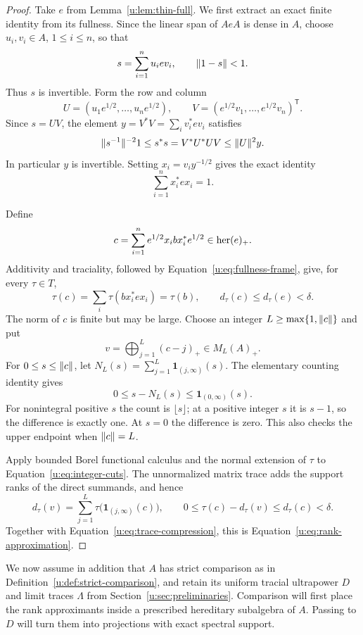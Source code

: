 \begin{proof}
Take $e$ from Lemma~\ref{u:lem:thin-full}.  We first extract an exact
finite identity from its fullness.  Since the linear span of $AeA$ is
dense in $A$, choose $u_i,v_i\in A$, $1\le i\le n$, so that
\[
 s=\sum_{i=1}^n u_i e v_i,\qquad \lVert1-s\rVert<1.
\]
Thus $s$ is invertible.  Form the row and column
\[
 U=(u_1e^{1/2},\ldots,u_ne^{1/2}),\qquad
 V=(e^{1/2}v_1,\ldots,e^{1/2}v_n)^{\mathsf T}.
\]
Since $s=UV$, the element $y=V^*V=\sum_i v_i^*ev_i$ satisfies
\[
 \lVert s^{-1}\rVert^{-2}1\le s^*s
       =V^*U^*UV\le\lVert U\rVert^2 y.
\]
In particular $y$ is invertible.  Setting $x_i=v_i y^{-1/2}$ gives
the exact identity
\begin{equation}
 \sum_{i=1}^n x_i^* e x_i=1.
 \label{u:eq:fullness-frame}
\end{equation}

Define
\[
 c=\sum_{i=1}^n e^{1/2}x_i b x_i^*e^{1/2}\in\operatorname{her}(e)_+.
\]
Additivity and traciality, followed by
Equation~\eqref{u:eq:fullness-frame}, give, for every $\tau\in T$,
\begin{equation}
 \tau(c)=\sum_i\tau(bx_i^*ex_i)=\tau(b),
 \qquad d_\tau(c)\le d_\tau(e)<\delta.
 \label{u:eq:trace-compression}
\end{equation}
The norm of $c$ is finite but may be large.  Choose an integer
$L\ge\max\{1,\lVert c\rVert\}$ and put
\[
 v=\bigoplus_{j=1}^{L}(c-j)_+\in M_L(A)_+.
\]
For $0\le s\le\lVert c\rVert$, let
$N_L(s)=\sum_{j=1}^L\mathbf 1_{(j,\infty)}(s)$.  The elementary
counting identity gives
\begin{equation}
 0\le s-N_L(s)\le\mathbf 1_{(0,\infty)}(s).
 \label{u:eq:integer-cuts}
\end{equation}
For nonintegral positive $s$ the count is $\lfloor s\rfloor$; at a
positive integer $s$ it is $s-1$, so the difference is exactly one.
At $s=0$ the difference is zero.  This also checks the upper endpoint
when $\lVert c\rVert=L$.

Apply bounded Borel functional calculus and the normal extension of
$\tau$ to Equation~\eqref{u:eq:integer-cuts}.  The unnormalized matrix
trace adds the support ranks of the direct summands, and hence
\[
 d_\tau(v)=\sum_{j=1}^L\tau\bigl(\mathbf 1_{(j,\infty)}(c)\bigr),
 \qquad
 0\le\tau(c)-d_\tau(v)\le d_\tau(c)<\delta.
\]
Together with Equation~\eqref{u:eq:trace-compression}, this is
Equation~\eqref{u:eq:rank-approximation}.
\end{proof}


We now assume in addition that $A$ has strict comparison as in
Definition~\ref{u:def:strict-comparison}, and retain its uniform tracial
ultrapower $D$ and limit traces $\Lambda$ from
Section~\ref{u:sec:preliminaries}.  Comparison will first place the rank
approximants inside a prescribed hereditary subalgebra of $A$.  Passing
to $D$ will turn them into projections with exact spectral support.

